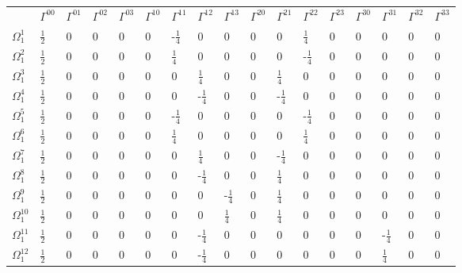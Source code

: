 \begin{tiny}
    \begin{table}[]
        \label{table:theta}
        \begin{tabular}{lllllllllllllllll}
                            & $\Gamma^{00}$	&	$\Gamma^{01}$	&	$\Gamma^{02}$	&	$\Gamma^{03}$	&	$\Gamma^{10}$	&	$\Gamma^{11}$	&	$\Gamma^{12}$	&	$\Gamma^{13}$	&	$\Gamma^{20}$	&	$\Gamma^{21}$	&	$\Gamma^{22}$	&	$\Gamma^{23}$	&	$\Gamma^{30}$	&	$\Gamma^{31}$	&	$\Gamma^{32}$	&	$\Gamma^{33}$ \\ 
            $\Omega_{1}^{1}$ & $\frac{1}{2}$	&	0	&	0	&	0	&	0	&	-$\frac{1}{4}$	&	0	&	0	&	0	&	0	&	$\frac{1}{4}$	&	0	&	0	&	0	&	0	&	0 \\ 
            $\Omega_{1}^{2}$ & $\frac{1}{2}$	&	0	&	0	&	0	&	0	&	$\frac{1}{4}$	&	0	&	0	&	0	&	0	&	-$\frac{1}{4}$	&	0	&	0	&	0	&	0	&	0 \\ 
            $\Omega_{1}^{3}$ & $\frac{1}{2}$	&	0	&	0	&	0	&	0	&	0	&	$\frac{1}{4}$	&	0	&	0	&	$\frac{1}{4}$	&	0	&	0	&	0	&	0	&	0	&	0 \\ 
            $\Omega_{1}^{4}$ & $\frac{1}{2}$	&	0	&	0	&	0	&	0	&	0	&	-$\frac{1}{4}$	&	0	&	0	&	-$\frac{1}{4}$	&	0	&	0	&	0	&	0	&	0	&	0 \\ 
            $\Omega_{1}^{5}$ & $\frac{1}{2}$	&	0	&	0	&	0	&	0	&	-$\frac{1}{4}$	&	0	&	0	&	0	&	0	&	-$\frac{1}{4}$	&	0	&	0	&	0	&	0	&	0 \\ 
            $\Omega_{1}^{6}$ & $\frac{1}{2}$	&	0	&	0	&	0	&	0	&	$\frac{1}{4}$	&	0	&	0	&	0	&	0	&	$\frac{1}{4}$	&	0	&	0	&	0	&	0	&	0 \\ 
            $\Omega_{1}^{7}$ & $\frac{1}{2}$	&	0	&	0	&	0	&	0	&	0	&	$\frac{1}{4}$	&	0	&	0	&	-$\frac{1}{4}$	&	0	&	0	&	0	&	0	&	0	&	0 \\ 
            $\Omega_{1}^{8}$ & $\frac{1}{2}$	&	0	&	0	&	0	&	0	&	0	&	-$\frac{1}{4}$	&	0	&	0	&	$\frac{1}{4}$	&	0	&	0	&	0	&	0	&	0	&	0 \\ 
            $\Omega_{1}^{9}$ & $\frac{1}{2}$	&	0	&	0	&	0	&	0	&	0	&	0	&	-$\frac{1}{4}$	&	0	&	$\frac{1}{4}$	&	0	&	0	&	0	&	0	&	0	&	0 \\ 
            $\Omega_{1}^{10}$ & $\frac{1}{2}$	&	0	&	0	&	0	&	0	&	0	&	0	&	$\frac{1}{4}$	&	0	&	$\frac{1}{4}$	&	0	&	0	&	0	&	0	&	0	&	0 \\ 
            $\Omega_{1}^{11}$ & $\frac{1}{2}$	&	0	&	0	&	0	&	0	&	0	&	-$\frac{1}{4}$	&	0	&	0	&	0	&	0	&	0	&	0	&	-$\frac{1}{4}$	&	0	&	0 \\ 
            $\Omega_{1}^{12}$ & $\frac{1}{2}$	&	0	&	0	&	0	&	0	&	0	&	-$\frac{1}{4}$	&	0	&	0	&	0	&	0	&	0	&	0	&	$\frac{1}{4}$	&	0	&	0 \\ 

\end{tabular}
\end{table}
\end{tiny}
